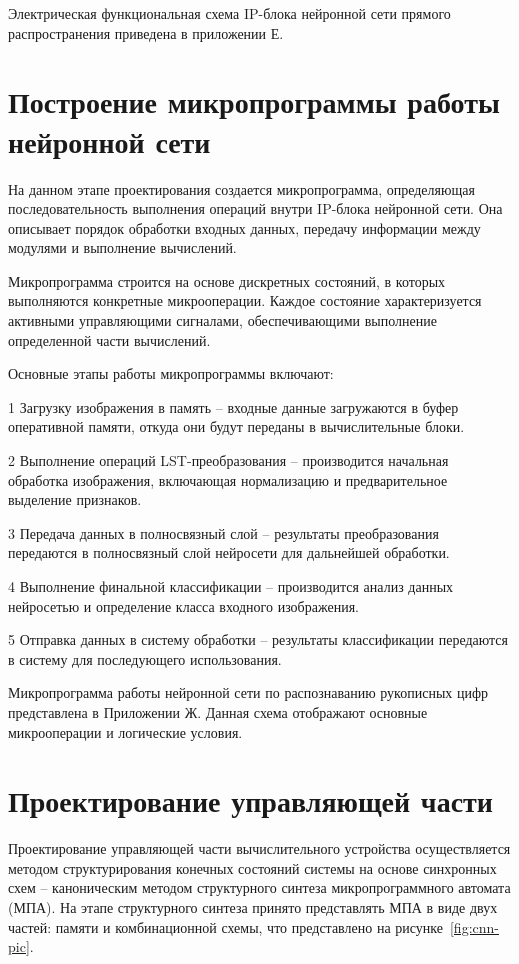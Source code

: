 Электрическая функциональная схема IP-блока нейронной сети прямого 
распространения приведена в приложении Е.

\section{Построение микропрограммы работы нейронной сети}
\hspace*{12.5 mm}На данном этапе проектирования создается микропрограмма, 
определяющая последовательность выполнения операций внутри IP-блока нейронной 
сети. Она описывает порядок обработки входных данных, передачу информации между 
модулями и выполнение вычислений.

Микропрограмма строится на основе дискретных состояний, в которых выполняются 
конкретные микрооперации. Каждое состояние характеризуется активными 
управляющими сигналами, обеспечивающими выполнение определенной части 
вычислений.

Основные этапы работы микропрограммы включают:

  1 Загрузку изображения в память – входные данные загружаются в буфер 
оперативной памяти, откуда они будут переданы в вычислительные блоки.

  2 Выполнение операций LST-преобразования – производится начальная обработка 
изображения, включающая нормализацию и предварительное выделение признаков.

  3 Передача данных в полносвязный слой – результаты преобразования передаются 
в полносвязный слой нейросети для дальнейшей обработки.

  4 Выполнение финальной классификации – производится анализ данных нейросетью
и определение класса входного изображения.

  5 Отправка данных в систему обработки – результаты классификации передаются
в систему для последующего использования.

Микропрограмма работы нейронной сети по распознаванию рукописных цифр 
представлена в Приложении Ж. Данная схема отображают основные микрооперации и 
логические условия.

\section{Проектирование управляющей части}
\hspace*{12.5 mm}Проектирование управляющей части вычислительного устройства 
осуществляется методом структурирования конечных состояний системы на основе 
синхронных схем – каноническим методом структурного синтеза микропрограммного 
автомата (МПА). На этапе структурного синтеза принято представлять МПА в виде 
двух частей: памяти и комбинационной схемы, что представлено на 
рисунке~\ref{fig:cnn-pic}.

